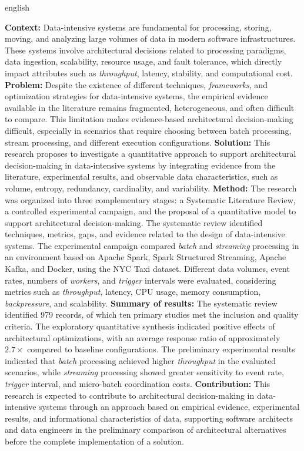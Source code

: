 \setlength{\absparsep}{18pt}
\begin{resumo}[Abstract]
\begin{otherlanguage*}{english}


\textbf{Context:} Data-intensive systems are fundamental for processing, storing, moving, and analyzing large volumes of data in modern software infrastructures. These systems involve architectural decisions related to processing paradigms, data ingestion, scalability, resource usage, and fault tolerance, which directly impact attributes such as \textit{throughput}, latency, stability, and computational cost. \textbf{Problem:} Despite the existence of different techniques, \textit{frameworks}, and optimization strategies for data-intensive systems, the empirical evidence available in the literature remains fragmented, heterogeneous, and often difficult to compare. This limitation makes evidence-based architectural decision-making difficult, especially in scenarios that require choosing between batch processing, stream processing, and different execution configurations. \textbf{Solution:} This research proposes to investigate a quantitative approach to support architectural decision-making in data-intensive systems by integrating evidence from the literature, experimental results, and observable data characteristics, such as volume, entropy, redundancy, cardinality, and variability. \textbf{Method:} The research was organized into three complementary stages: a Systematic Literature Review, a controlled experimental campaign, and the proposal of a quantitative model to support architectural decision-making. The systematic review identified techniques, metrics, gaps, and evidence related to the design of data-intensive systems. The experimental campaign compared \textit{batch} and \textit{streaming} processing in an environment based on Apache Spark, Spark Structured Streaming, Apache Kafka, and Docker, using the NYC Taxi dataset. Different data volumes, event rates, numbers of \textit{workers}, and \textit{trigger} intervals were evaluated, considering metrics such as \textit{throughput}, latency, CPU usage, memory consumption, \textit{backpressure}, and scalability. \textbf{Summary of results:} The systematic review identified 979 records, of which ten primary studies met the inclusion and quality criteria. The exploratory quantitative synthesis indicated positive effects of architectural optimizations, with an average response ratio of approximately $2.7\times$ compared to baseline configurations. The preliminary experimental results indicated that \textit{batch} processing achieved higher \textit{throughput} in the evaluated scenarios, while \textit{streaming} processing showed greater sensitivity to event rate, \textit{trigger} interval, and micro-batch coordination costs. \textbf{Contribution:} This research is expected to contribute to architectural decision-making in data-intensive systems through an approach based on empirical evidence, experimental results, and informational characteristics of data, supporting software architects and data engineers in the preliminary comparison of architectural alternatives before the complete implementation of a solution.


\end{otherlanguage*}
\end{resumo}
